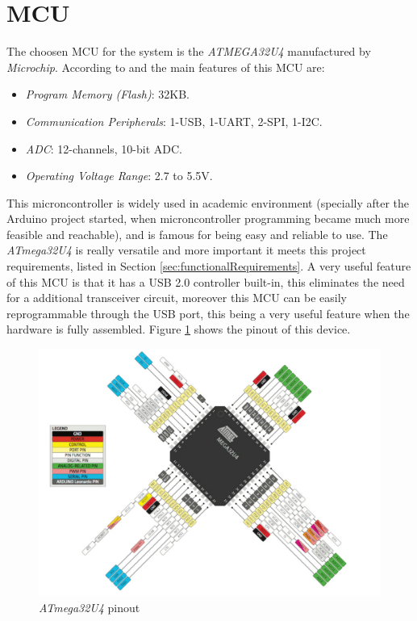 \section{MCU}\label{sec:mcu-hw}

	The choosen MCU for the system is the \textit{ATMEGA32U4} manufactured by \textit{Microchip}. According to \cite{atmega32u4-features} and \cite{atmega32u4-datasheet} the main features of this MCU are:
		\begin{itemize}
			\item{\textit{Program Memory (Flash)}}: 32KB.\label{itm:program-memory-flash}
			\item{\textit{Communication Peripherals}}: 1-USB, 1-UART, 2-SPI, 1-I2C.\label{itm:communication-peripherals}
			\item{\textit{ADC}}: 12-channels, 10-bit ADC.\label{itm:hw-mcu-adc}
			\item{\textit{Operating Voltage Range}}: 2.7 to 5.5V.\label{itm:operating-voltage-range}
		\end{itemize}
	\par
	This microncontroller is widely used in academic environment (specially after the Arduino project started, when microncontroller programming became much more feasible and reachable), and is famous for being easy and reliable to use. The \textit{ATmega32U4} is really versatile and more important it meets this project requirements, listed in Section \ref{sec:functionalRequirements}. A very useful feature of this MCU is that it has a USB 2.0 controller built-in, this eliminates the need for a additional transceiver circuit, moreover this MCU can be easily reprogrammable through the USB port, this being a very useful feature when the hardware is fully assembled. Figure \ref{fig:atmega32u4-pinout} shows the pinout of this device.

	\begin{figure}[htbp]
		\centering
		\includegraphics[width=.8\textwidth]{figuras/fig-atmega32u4-pinout.png}
		\caption{\textit{ATmega32U4} pinout \cite{atmega32u4-pinout}}
		\label{fig:atmega32u4-pinout}
	\end{figure}
		

